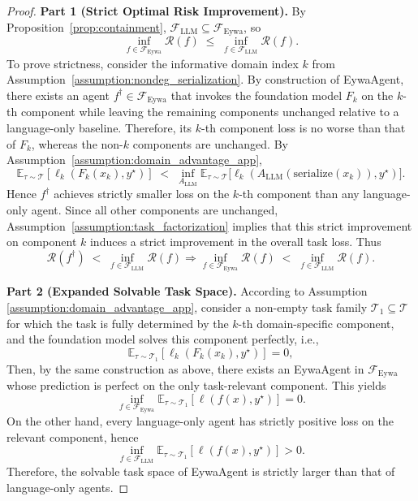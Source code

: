 \begin{proof}
\textbf{Part 1 (Strict Optimal Risk Improvement).} By Proposition~\ref{prop:containment}, $\mathcal{F}_{\mathrm{LLM}}\subseteq\mathcal{F}_{\mathrm{Eywa}}$, so
\begin{equation}
\label{eq:inf_eywa_inf_llm}
\inf_{f\in\mathcal{F}_{\mathrm{Eywa}}}\mathcal{R}(f)\;\le\;\inf_{f\in\mathcal{F}_{\mathrm{LLM}}}\mathcal{R}(f). 
\end{equation}
To prove strictness, consider the informative domain index $k$ from Assumption~\ref{assumption:nondeg_serialization}. By construction of EywaAgent, there exists an agent $f^\dagger\in\mathcal{F}_{\mathrm{Eywa}}$ that invokes the foundation model $F_k$ on the $k$-th component while leaving the remaining components unchanged relative to a language-only baseline. Therefore, its $k$-th component loss is no worse than that of $F_k$, whereas the non-$k$ components are unchanged.
By Assumption~\ref{assumption:domain_advantage_app},
\begin{equation}
\mathbb{E}_{\tau\sim\mathcal{T}}[\ell_k(F_k(x_k),y^\star)]
\;<\;
\inf_{A_{\mathrm{LLM}}}\mathbb{E}_{\tau\sim\mathcal{T}}
\big[\ell_k(A_{\mathrm{LLM}}(\mathrm{serialize}(x_k)),y^\star)\big].
\end{equation}
Hence $f^\dagger$ achieves strictly smaller loss on the $k$-th component than any language-only agent. Since all other components are unchanged, Assumption~\ref{assumption:task_factorization} implies that this strict improvement on component $k$ induces a strict improvement in the overall task loss. Thus
\begin{equation}
\mathcal{R}(f^\dagger)
\;<\;
\inf_{f\in\mathcal{F}_{\mathrm{LLM}}}\mathcal{R}(f)
\Longrightarrow
\inf_{f\in\mathcal{F}_{\mathrm{Eywa}}}\mathcal{R}(f)
\;<\;
\inf_{f\in\mathcal{F}_{\mathrm{LLM}}}\mathcal{R}(f).
\end{equation}


\textbf{Part 2 (Expanded Solvable Task Space).}
According to Assumption \ref{assumption:domain_advantage_app}, consider a non-empty task family $\mathcal{T}_1\subseteq\mathcal{T}$ for which the task is fully determined by the $k$-th domain-specific component, and  the foundation model solves this component perfectly, i.e.,
\begin{equation}
\mathbb{E}_{\tau\sim\mathcal{T}_1}[\ell_k(F_k(x_k),y^\star)] = 0,
\end{equation}
Then, by the same construction as above, there exists an EywaAgent in $\mathcal{F}_{\mathrm{Eywa}}$ whose prediction is perfect on the only task-relevant component. This yields
\begin{equation}
\inf_{f\in\mathcal{F}_{\mathrm{Eywa}}}
\mathbb{E}_{\tau\sim\mathcal{T}_1}[\ell(f(x),y^\star)] = 0.
\end{equation}
On the other hand, every language-only agent has strictly positive loss on the relevant component, hence
\begin{equation}
\inf_{f\in\mathcal{F}_{\mathrm{LLM}}}
\mathbb{E}_{\tau\sim\mathcal{T}_1}[\ell(f(x),y^\star)] > 0.
\end{equation}
Therefore, the solvable task space of EywaAgent is strictly larger than that of language-only agents.
\end{proof}

